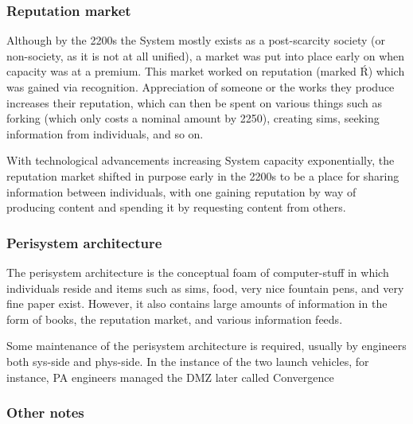 \subsubsection{Reputation market}

Although by the 2200s the System mostly exists as a post-scarcity society (or non-society, as it is not at all unified), a market was put into place early on when capacity was at a premium. This market worked on reputation (marked Ŕ) which was gained via recognition. Appreciation of someone or the works they produce increases their reputation, which can then be spent on various things such as forking (which only costs a nominal amount by 2250), creating sims, seeking information from individuals, and so on.

With technological advancements increasing System capacity exponentially, the reputation market shifted in purpose early in the 2200s to be a place for sharing information between individuals, with one gaining reputation by way of producing content and spending it by requesting content from others.

\subsubsection{Perisystem architecture}

The perisystem architecture is the conceptual foam of computer-stuff in which individuals reside and items such as sims, food, very nice fountain pens, and very fine paper exist. However, it also contains large amounts of information in the form of books, the reputation market, and various information feeds.

Some maintenance of the perisystem architecture is required, usually by engineers both sys-side and phys-side. In the instance of the two launch vehicles, for instance, PA engineers managed the DMZ {later called Convergence}

\subsubsection{Other notes}

